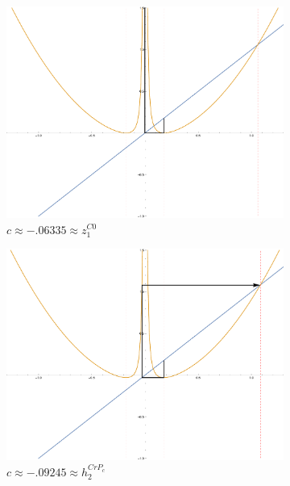 \begin{figure}[ht]
		\begin{subfigure}[b]{0.3\textwidth}
				\includegraphics[width=\textwidth]{./img/plot-006355}
				\caption{$c \approx -.06335 \approx z_1^{C0}$}
		\end{subfigure}
		\begin{subfigure}[b]{0.3\textwidth}
				\includegraphics[width=\textwidth]{./img/plot-009245}
				\caption{$c \approx -.09245 \approx h_2^{CrP_c}$}
		\end{subfigure}
		\begin{subfigure}[b]{0.3\textwidth}

\end{subfigure}
\end{figure}
